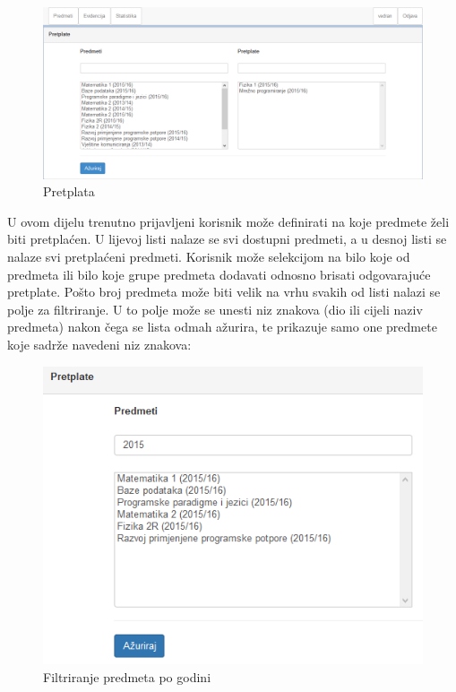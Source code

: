 \documentclass[times, utf8, zavrsni]{fer}
\begin{document}
\begin{figure}[H]
\centering
\includegraphics[width=\textwidth,height=\textheight,keepaspectratio]{img/pretplata-web.png}
\caption{Pretplata}
\label{fig:pretplata-web}
\end{figure}

U ovom dijelu trenutno prijavljeni korisnik može definirati na koje predmete želi biti pretplaćen. U lijevoj listi nalaze se svi dostupni predmeti, a u desnoj listi se nalaze svi pretplaćeni predmeti. Korisnik može selekcijom na bilo koje od predmeta ili bilo koje grupe predmeta dodavati odnosno brisati odgovarajuće pretplate. Pošto broj predmeta može biti velik na vrhu svakih od listi nalazi se polje za filtriranje. U to polje može se unesti niz znakova (dio ili cijeli naziv predmeta) nakon čega se lista odmah ažurira, te prikazuje samo one predmete koje sadrže navedeni niz znakova:\\

\begin{figure}[H]
\centering
\includegraphics[width=\textwidth,height=\textheight,keepaspectratio]{img/filtriranje.png}
\caption{Filtriranje predmeta po godini}
\label{fig:filtriranje}
\end{figure}
\end{document}

